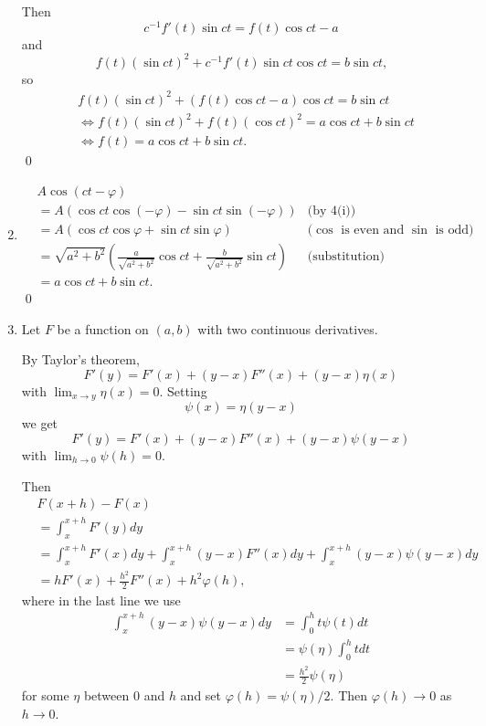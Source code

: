 \documentclass[oneside]{article}
\begin{document}
\begin{enumerate}[label=\textbf{\arabic*.}]
  Then \[
    c^{-1}f'(t)\sin ct = f(t)\cos ct - a
  \] and \[
    f(t)(\sin ct)^2 + c^{-1} f'(t) \sin ct\cos ct = b\sin ct \text{,}
  \] so \begin{align*}
    &f(t)(\sin ct)^2 + (f(t)\cos ct - a)\cos ct = b\sin ct \\
    &\iff f(t)(\sin ct)^2 + f(t)(\cos ct)^2 = a\cos ct + b\sin ct \\
    &\iff f(t) = a\cos ct + b\sin ct \text{.}
  \end{align*}\qed

  \item
  \begin{align*}
    &A \cos(ct - \varphi) \\
    &= A(\cos ct\cos(-\varphi)-\sin ct\sin(-\varphi))
      &\text{(by 4(i))} \\
    &= A(\cos ct\cos\varphi + \sin ct\sin\varphi)
      &\text{($\cos$ is even and $\sin$ is odd)} \\
    &= \sqrt{a^2+b^2}(\frac{a}{\sqrt{a^2+b^2}}\cos ct
        + \frac{b}{\sqrt{a^2+b^2}}\sin ct)
      &\text{(substitution)}\\
    &= a\cos ct + b\sin ct \text{.}
  \end{align*} \qed

  \item
  Let $F$ be a function on $(a, b)$ with two continuous derivatives.

By Taylor's theorem, \[
  F'(y) = F'(x) + (y-x)F''(x) + (y-x)\eta(x)
\] with $\lim_{x\to y}\eta(x) = 0$. Setting \[
  \psi(x) = \eta(y-x)
\] we get \[
  F'(y) = F'(x) + (y-x)F''(x) + (y-x)\psi(y-x)
\] with $\lim_{h\to0}\psi(h) = 0$.

Then \begin{align*}
  &F(x+h) - F(x) \\
  &= \int_x^{x+h}F'(y)dy \\
  &= \int_x^{x+h}F'(x)dy + \int_x^{x+h}(y-x)F''(x)dy + \int_x^{x+h}(y-x)\psi(y-x)dy \\
  &= hF'(x) + \frac{h^2}{2}F''(x) + h^2\varphi(h) \text{,}
\end{align*}
where in the last line we use\begin{align*}
  \int_x^{x+h}(y-x)\psi(y-x)dy
  &= \int_0^ht\psi(t)dt \\
  &= \psi(\eta)\int_0^htdt \\
  &= \frac{h^2}{2}\psi(\eta)
\end{align*} for some $\eta$ between $0$ and $h$ and set
$\varphi(h) = \psi(\eta) / 2$. Then $\varphi(h) \to 0$ as $h \to 0$.


\end{enumerate}
\end{document}
